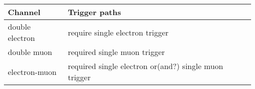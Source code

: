 \begin{table}[]
    \begin{tabular}{@{}ll@{}}
    \toprule
    Channel  & Trigger paths                           \\ \midrule
    double electron & require single electron trigger             \\
    double muon & required single muon trigger \\             
    electron-muon & required single electron or(and?) single muon trigger                      \\ \bottomrule
    \end{tabular}
\end{table}